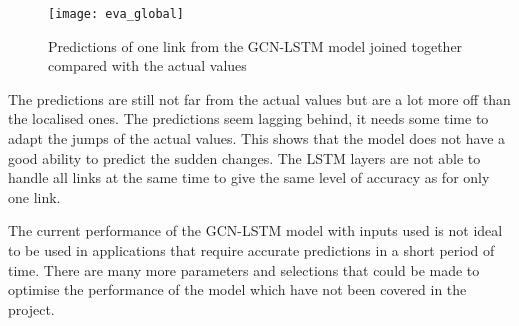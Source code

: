 \begin{figure}[!htb]
    \centering
    \texttt{[image: eva\_global]}
    \caption{Predictions of one link from the GCN-LSTM model joined together compared with the actual values}
    \label{Figure:eva_global}
\end{figure}

The predictions are still not far from the actual values but are a lot more off than the localised ones. 
The predictions seem lagging behind, it needs some time to adapt the jumps of the actual values. This shows that the model does not have a good ability to predict the sudden changes. 
The LSTM layers are not able to handle all links at the same time to give the same level of accuracy as for only one link.

The current performance of the GCN-LSTM model with inputs used is not ideal to be used in applications that require accurate predictions in a short period of time.
There are many more parameters and selections that could be made to optimise the performance of the model which have not been covered in the project. 

